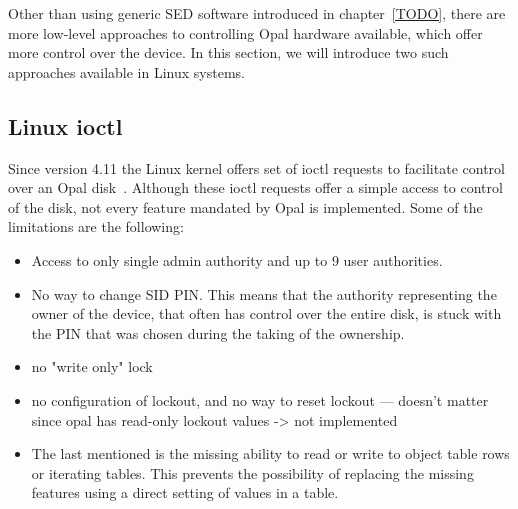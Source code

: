 Other than using generic SED software introduced in chapter~\ref{TODO}, there are more low-level approaches to controlling Opal hardware available, which offer more control over the device. In this section, we will introduce two such approaches available in Linux systems.

\subsection{Linux ioctl}

Since version 4.11 the Linux kernel offers set of ioctl requests to facilitate control over an Opal disk~\cite{linux-opal-introduction-mail}. Although these ioctl requests offer a simple access to control of the disk, not every feature mandated by Opal is implemented. Some of the limitations are the following: 
\begin{itemize}
\item Access to only single admin authority and up to 9 user authorities.
\item No way to change SID PIN. This means that the authority representing the owner of the device, that often has control over the entire disk, is stuck with the PIN that was chosen during the taking of the ownership.  
\item no "write only" lock
\item no configuration of lockout, and no way to reset lockout --- doesn't matter since opal has read-only lockout values -> not implemented
\item The last mentioned is the missing  ability to read or write to object table rows or iterating tables. This prevents the possibility of replacing the missing features using a direct setting of values in a table.
\end{itemize}

